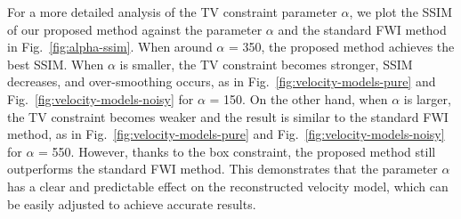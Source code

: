 For a more detailed analysis of the TV constraint parameter $\alpha$, we plot the SSIM of our proposed method against the parameter $\alpha$ and the standard FWI method in Fig.~\ref{fig:alpha-ssim}.
When around $\alpha$ = 350, the proposed method achieves the best SSIM.
When $\alpha$ is smaller, the TV constraint becomes stronger, SSIM decreases, and over-smoothing occurs, as in Fig.~\ref{fig:velocity-models-pure} and Fig.~\ref{fig:velocity-models-noisy} for $\alpha$ = 150.
On the other hand, when $\alpha$ is larger, the TV constraint becomes weaker and the result is similar to the standard FWI method, as in Fig.~\ref{fig:velocity-models-pure} and Fig.~\ref{fig:velocity-models-noisy} for $\alpha$ = 550.
However, thanks to the box constraint, the proposed method still outperforms the standard FWI method.
This demonstrates that the parameter $\alpha$ has a clear and predictable effect on the reconstructed velocity model, which can be easily adjusted to achieve accurate results.


